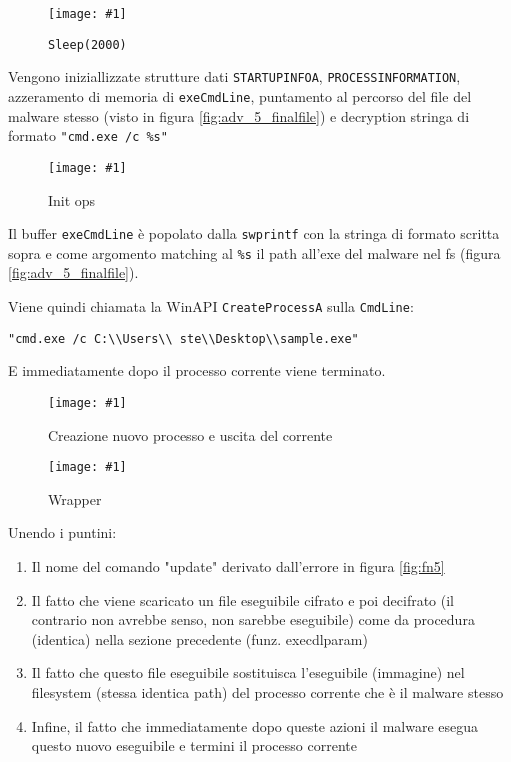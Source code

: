 \documentclass[
    a4paper, %
    11pt %
]{article}
\newcommand{\pic}[4]{\begin{figure}[H]
            \centering
            \texttt{[image: \#1]}
            \caption{#2}
            \label{fig:#1}
            \end{figure}}
\begin{document}
            \pic{adv_5_later}{\texttt{Sleep(2000)}}{9cm}{2cm}

            Vengono iniziallizzate strutture dati \texttt{STARTUPINFOA}, \texttt{PROCESSINFORMATION},
            azzeramento di memoria di \texttt{exeCmdLine}, puntamento al percorso del file del malware stesso 
            (visto in figura \ref{fig:adv_5_finalfile}) e decryption stringa di formato \texttt{"cmd.exe /c 
            \%s"} 

            \pic{adv_5_later_init}{Init ops}{15cm}{7.5cm}

            Il buffer \texttt{exeCmdLine} è popolato dalla \texttt{swprintf} con la stringa di formato scritta
            sopra e come argomento matching al \texttt{\%s} il path all'exe del malware nel fs (figura 
            \ref{fig:adv_5_finalfile}).

            Viene quindi chiamata la WinAPI \texttt{CreateProcessA} sulla \texttt{CmdLine}:

            \begin{center}
                \texttt{"cmd.exe /c C:\textbackslash\textbackslash Users\textbackslash\textbackslash 
                ste\textbackslash\textbackslash Desktop\textbackslash\textbackslash sample.exe"}
            \end{center}

            E immediatamente dopo il processo corrente viene terminato.
            
            \pic{adv_5_later_cpa_then_exit}{Creazione nuovo processo e uscita del corrente}{18cm}{2.5cm}

            \pic{adv_5_later_epw}{Wrapper}{9cm}{4cm}

            Unendo i puntini:
            \begin{enumerate}
                \item Il nome del comando "update" derivato dall'errore in figura \ref{fig:fn5}
                \item Il fatto che viene scaricato un file eseguibile cifrato e poi decifrato (il contrario non 
                avrebbe senso, non sarebbe eseguibile) come da procedura (identica) nella sezione precedente 
                (funz. execdlparam)
                \item Il fatto che questo file eseguibile sostituisca l'eseguibile (immagine) nel filesystem (stessa identica path) del processo 
                corrente che è il malware stesso
                \item Infine, il fatto che immediatamente dopo queste azioni il malware esegua questo nuovo
                eseguibile e termini il processo corrente
            \end{enumerate}
\end{document}
